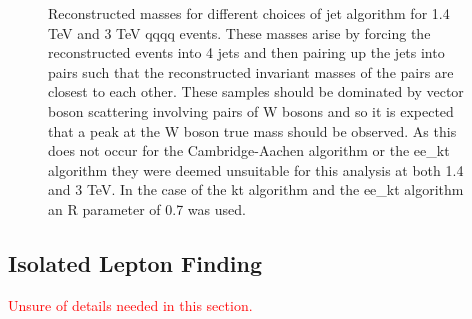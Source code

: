 \begin{figure}
\centering
{}
\caption[Reconstructed invariant masses for different choices of jet algorithm for 1.4 TeV and 3 TeV \nu{\nu}qqqq events.]{Reconstructed masses for different choices of jet algorithm for 1.4 TeV and 3 TeV \nu{\nu}qqqq events. These masses arise by forcing the reconstructed events into 4 jets and then pairing up the jets into pairs such that the reconstructed invariant masses of the pairs are closest to each other. These samples should be dominated by vector boson scattering involving pairs of W bosons and so it is expected that a peak at the W boson true mass should be observed. As this does not occur for the Cambridge-Aachen algorithm or the ee\_kt algorithm they were deemed unsuitable for this analysis at both 1.4 and 3 TeV. In the case of the kt algorithm and the ee\_kt algorithm an R parameter of 0.7 was used.}
\label{fig:invariantmassalgoveto}
\end{figure}

\subsection{Isolated Lepton Finding} 
\label{sec:isolatedleptonfinding}

\textcolor{red}{Unsure of details needed in this section.}

